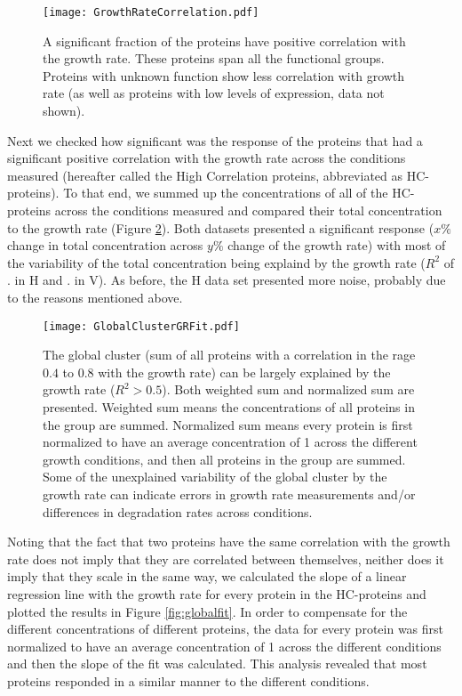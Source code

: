 \documentclass[notitlepage]{article}
\begin{document}
\begin{figure}[h]
\centering
\texttt{[image: GrowthRateCorrelation.pdf]}
\caption{
A significant fraction of the proteins have positive correlation with the growth rate.
These proteins span all the functional groups.
Proteins with unknown function show less correlation with growth rate (as well as proteins with low levels of expression, data not shown).
}
\label{fig:growthcorr}
\end{figure}

Next we checked how significant was the response of the proteins that had a significant positive correlation with the growth rate across the conditions measured (hereafter called the High Correlation proteins, abbreviated as HC-proteins).
To that end, we summed up the concentrations of all of the HC-proteins across the conditions measured and compared their total concentration to the growth rate (Figure \ref{fig:globalgrcorr}).
Both datasets presented a significant response ($x\% $ change in total concentration across $y\% $ change of the growth rate) with most of the variability of the total concentration being explaind by the growth rate ($R^2$ of . in H and . in V). 
As before, the H data set presented more noise, probably due to the reasons mentioned above.

\begin{figure}[h]
\centering
\texttt{[image: GlobalClusterGRFit.pdf]}
\caption{
The global cluster (sum of all proteins with a correlation in the rage $0.4$ to $0.8$ with the growth rate) can be largely explained by the growth rate ($R^2>0.5$).
Both weighted sum and normalized sum are presented.
Weighted sum means the concentrations of all proteins in the group are summed.
Normalized sum means every protein is first normalized to have an average concentration of 1 across the different growth conditions, and then all proteins in the group are summed.
Some of the unexplained variability of the global cluster by the growth rate can indicate errors in growth rate measurements and/or differences in degradation rates across conditions.
}
\label{fig:globalgrcorr}
\end{figure}

Noting that the fact that two proteins have the same correlation with the growth rate does not imply that they are correlated between themselves, neither does it imply that they scale in the same way, we calculated the slope of a linear regression line with the growth rate for every protein in the HC-proteins and plotted the results in Figure \ref{fig:globalfit}.
In order to compensate for the different concentrations of different proteins, the data for every protein was first normalized to have an average concentration of 1 across the different conditions and then the slope of the fit was calculated.
This analysis revealed that most proteins responded in a similar manner to the different conditions.
\end{document}
